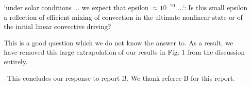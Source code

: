 \documentclass[aps, 11pt, singlecolumn]{revtex4-1} %
\begin{document}
\begin{singlespace}
\begin{myquotation}
`under solar conditions ... we expect that epsilon  $\approx 10^{-20}$
...`: Is this small epsilon a reflection of efficient mixing of
convection in the ultimate nonlinear state or of the initial linear
convective driving?
\end{myquotation}
This is a good question which we do not know the answer to.  As a result, we have
removed this large extrapolation of our results in Fig. 1 from the discussion
entirely.

$\,$\newline\noindent
This concludes our response to report B.  We thank referee B for this report.

$\,$
\newline
\noindent


\end{singlespace}





\end{document}
